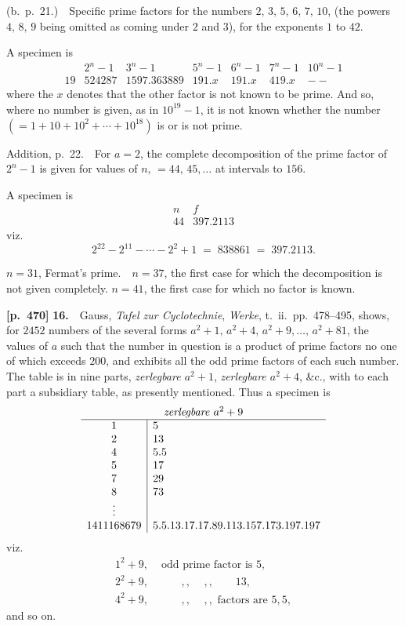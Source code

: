 \documentclass[11pt,a4paper]{article}
\begin{document}
(b.\ p.~21.)\ \ Specific prime factors for the numbers $2,\,3,\,5,\,6,\,7,\,10$, (the powers $4,\,8,\,9$ being omitted as coming under $2$ and $3$), for the exponents $1$ to $42$.

A specimen is
\[
\begin{array}{c|c|c|c|c|c|c}
   & 2^n-1 & 3^n-1 & 5^n-1 & 6^n-1 & 7^n-1 & 10^n-1 \\\hline
19 & 524287 & 1597.363889 & 191.x & 191.x & 419.x & --
\end{array}
\]
where the $x$ denotes that the other factor is not known to be prime.   And so, where no number is given, as in $10^{19}-1$, it is not known whether the number $(=1+10+10^2+\cdots+10^{18})$ is or is not prime.

Addition, p.~22.\ \ For $a=2$, the complete decomposition of the prime factor of $2^n-1$ is given for values of $n,\,=44,\,45,\ldots$ at intervals to $156$.

A specimen is
\[
\begin{array}{c|c}
n & f \\\hline
44 & 397.2113
\end{array}
\]
viz.
\[
2^{22}-2^{11}-\cdots-2^2+1\;=\;838861\;=\;397.2113.
\]

$n=31$, Fermat's prime.\ \ $n=37$, the first case for which the decomposition is not given completely.   $n=41$, the first case for which no factor is known.

\bigskip
\noindent\textbf{[p.~470]}\quad
\textbf{16.}\ \ Gauss, \textit{Tafel zur Cyclotechnie}, \textit{Werke}, t.~ii.\ pp.~478--495, shows, for $2452$ numbers of the several forms $a^2+1,\,a^2+4,\,a^2+9,\ldots,\,a^2+81$, the values of $a$ such that the number in question is a product of prime factors no one of which exceeds $200$, and exhibits all the odd prime factors of each such number.   The table is in nine parts, \textit{zerlegbare $a^2+1$}, \textit{zerlegbare $a^2+4$}, \&c., with to each part a subsidiary table, as presently mentioned.   Thus a specimen is
\[
\begin{array}{c|l}
\multicolumn{2}{c}{\text{\textit{zerlegbare} }a^2+9}\\\hline
1 & 5\\
2 & 13\\
4 & 5.5\\
5 & 17\\
7 & 29\\
8 & 73\\
\vdots & \\
1411168679 & 5.5.13.17.17.89.113.157.173.197.197
\end{array}
\]
viz.
\[
\begin{aligned}
1^2+9, &\text{ odd prime factor is }5,\\
2^2+9, &\quad\quad\,,, \quad\,,, \quad\quad 13,\\
4^2+9, &\quad\quad\,,, \quad\,,, \text{ factors are }5,5,
\end{aligned}
\]
and so on.
\end{document}
